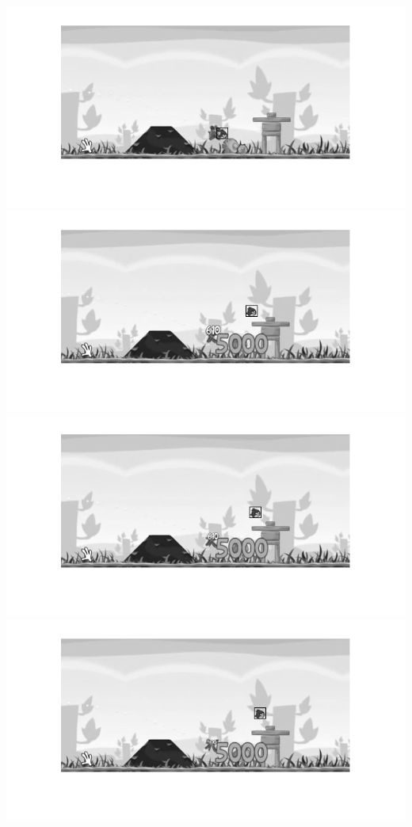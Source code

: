 \documentclass[a4paper]{iacas}
\begin{document}
\vskip 0.1in
\begin{minipage}{0.5\textwidth}
\centering
	\includegraphics[scale=0.8]{output/q4/algo_3/13.png}
	\includegraphics[scale=0.8]{output/q4/algo_3/18.png}
	\includegraphics[scale=0.8]{output/q4/algo_3/19.png}
	\includegraphics[scale=0.8]{output/q4/algo_3/20.png}
\end{minipage}
\vskip 0.1in
\end{document}
